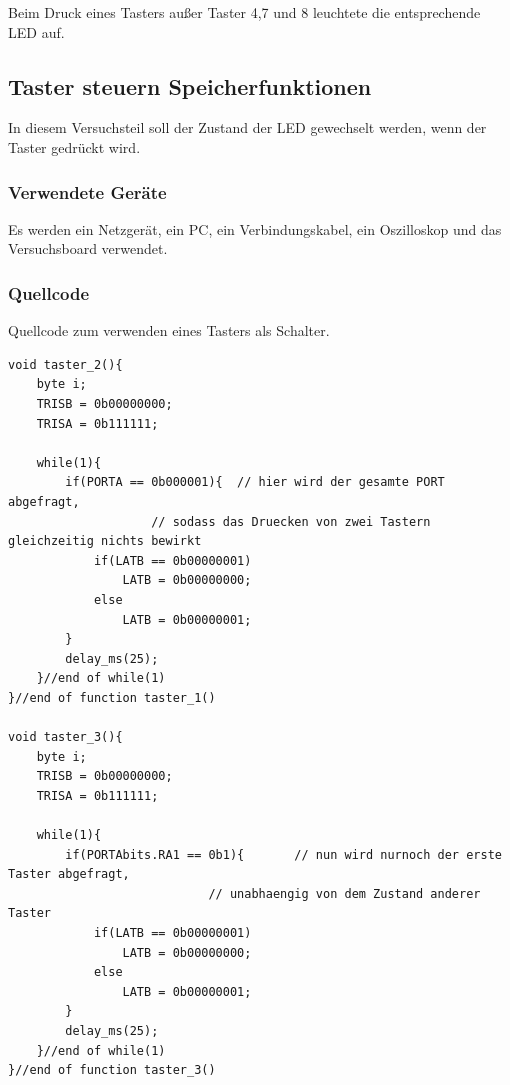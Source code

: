 \documentclass[12pt,a4paper]{article}
\begin{document}
Beim Druck eines Tasters außer  Taster 4,7 und 8 leuchtete die entsprechende LED auf.

\subsection{Taster steuern Speicherfunktionen}

In diesem Versuchsteil soll der Zustand der LED gewechselt werden, wenn der Taster gedrückt wird.

\subsubsection*{Verwendete Geräte}

Es werden ein Netzgerät, ein PC, ein Verbindungskabel, ein Oszilloskop und das Versuchsboard verwendet.

\subsubsection*{Quellcode}

Quellcode zum verwenden eines Tasters als Schalter.

\lstset{language=C, basicstyle=\tiny}
\begin{lstlisting}[caption = {Taster steuert Speicherfunktion}, label=lst:g_6,captionpos=b]
void taster_2(){
	byte i;
	TRISB = 0b00000000;
	TRISA = 0b111111;
	
	while(1){
		if(PORTA == 0b000001){	// hier wird der gesamte PORT abgefragt,
					// sodass das Druecken von zwei Tastern gleichzeitig nichts bewirkt
			if(LATB == 0b00000001)
				LATB = 0b00000000;
			else
				LATB = 0b00000001;
		}
		delay_ms(25);
	}//end of while(1)
}//end of function taster_1()

void taster_3(){
	byte i;
	TRISB = 0b00000000;
	TRISA = 0b111111;
	
	while(1){
		if(PORTAbits.RA1 == 0b1){		// nun wird nurnoch der erste Taster abgefragt,
							// unabhaengig von dem Zustand anderer Taster
			if(LATB == 0b00000001)
				LATB = 0b00000000;
			else
				LATB = 0b00000001;
		}
		delay_ms(25);
	}//end of while(1)
}//end of function taster_3()
\end{lstlisting}
\end{document}
